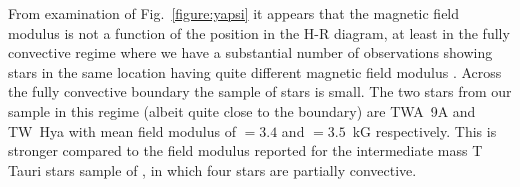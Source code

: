 \documentclass{aa}
\begin{document}
From examination of Fig.~\ref{figure:yapsi} it appears that the magnetic field modulus is not a function of the position in the H-R diagram, at least in the fully convective regime where we have a substantial number of observations showing stars in the same location having quite different magnetic field modulus {\bb}. Across the fully convective boundary the sample of stars is small. The two stars from our sample in this regime (albeit quite close to the boundary) are TWA~9A and TW~Hya with mean field modulus of \bb $= 3.4$ and \bb $= 3.5$~kG respectively. This is stronger compared to the field modulus reported for the intermediate mass T Tauri stars sample of \citet{2017A&A...608A..77L}, in which four stars are partially convective.

\end{document}
